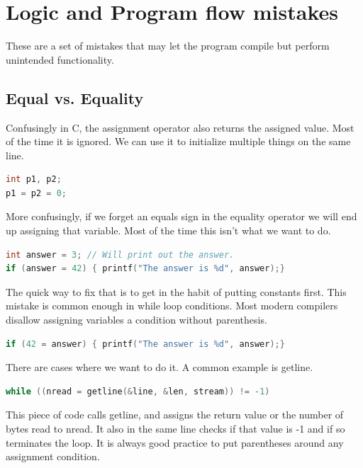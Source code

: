 \section{Logic and Program flow mistakes}

These are a set of mistakes that may let the program compile but perform unintended functionality.

\subsection{Equal vs. Equality}

Confusingly in C, the assignment operator also returns the assigned value.
Most of the time it is ignored.
We can use it to initialize multiple things on the same line.

\begin{lstlisting}[language=C]
int p1, p2;
p1 = p2 = 0;
\end{lstlisting}

More confusingly, if we forget an equals sign in the equality operator we will end up assigning that variable.
Most of the time this isn't what we want to do.

\begin{lstlisting}[language=C]
int answer = 3; // Will print out the answer.
if (answer = 42) { printf("The answer is %d", answer);}
\end{lstlisting}

The quick way to fix that is to get in the habit of putting constants first.
This mistake is common enough in while loop conditions.
Most modern compilers disallow assigning variables a condition without parenthesis.

\begin{lstlisting}[language=C]
  if (42 = answer) { printf("The answer is %d", answer);}
\end{lstlisting}

There are cases where we want to do it.
A common example is getline.

\begin{lstlisting}[language=C]
while ((nread = getline(&line, &len, stream)) != -1)
\end{lstlisting}

This piece of code calls getline, and assigns the return value or the number of bytes read to nread.
It also in the same line checks if that value is -1 and if so terminates the loop.
It is always good practice to put parentheses around any assignment condition.

